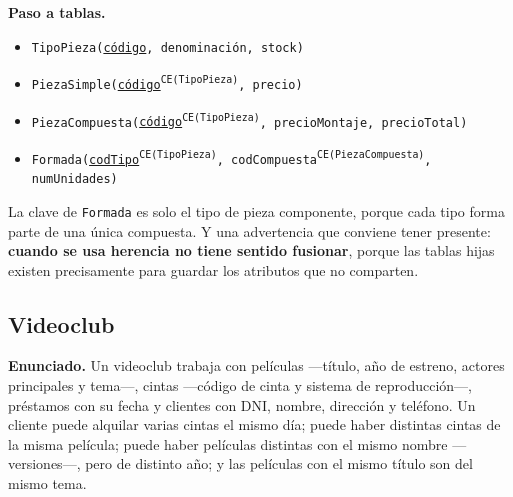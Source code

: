 \textbf{Paso a tablas.}

\begin{itemize}[leftmargin=*]
    \item \texttt{TipoPieza(\underline{código}, denominación, stock)}
    \item \texttt{PiezaSimple(\underline{código}\textsuperscript{CE(TipoPieza)},
          precio)}
    \item \texttt{PiezaCompuesta(\underline{código}\textsuperscript{CE(TipoPieza)},
          precioMontaje, precioTotal)}
    \item \texttt{Formada(\underline{codTipo}\textsuperscript{CE(TipoPieza)},
          codCompuesta\textsuperscript{CE(PiezaCompuesta)}, numUnidades)}
\end{itemize}

La clave de \texttt{Formada} es solo el tipo de pieza componente, porque cada
tipo forma parte de una única compuesta. Y una advertencia que conviene tener
presente: \textbf{cuando se usa herencia no tiene sentido fusionar}, porque las
tablas hijas existen precisamente para guardar los atributos que no comparten.

\subsection{Videoclub}

\textbf{Enunciado.} Un videoclub trabaja con películas —título, año de estreno,
actores principales y tema—, cintas —código de cinta y sistema de
reproducción—, préstamos con su fecha y clientes con DNI, nombre, dirección y
teléfono. Un cliente puede alquilar varias cintas el mismo día; puede haber
distintas cintas de la misma película; puede haber películas distintas con el
mismo nombre —versiones—, pero de distinto año; y las películas con el mismo
título son del mismo tema.

